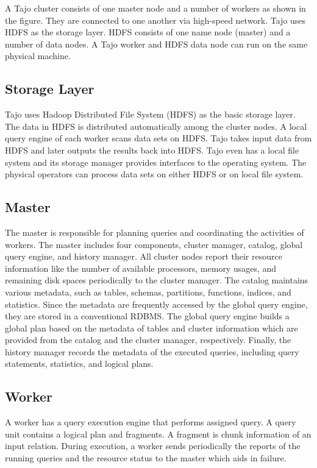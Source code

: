 \documentclass[9pt,twocolumn,twoside]{styles/osajnl}
\begin{document}
\cite{tajo-paper} A Tajo cluster consists of one master node and a
number of workers as shown in the figure. They are connected to one
another via high-speed network. Tajo uses HDFS as the storage
layer. HDFS consists of one name node (master) and a number of data
nodes. A Tajo worker and HDFS data node can run on the same physical
machine.

\subsection{Storage Layer}
\cite{tajo-paper}Tajo uses Hadoop Distributed File System (HDFS) as
the basic storage layer. The data in HDFS is distributed automatically
among the cluster nodes. A local query engine of each worker scans
data sets on HDFS. Tajo takes input data from HDFS and later outputs
the results back into HDFS. Tajo even has a local file system and its
storage manager provides interfaces to the operating system. The
physical operators can process data sets on either HDFS or on local
file system.

\subsection{Master}

\cite{tajo-paper} \cite{www-apache-tajo} The master is responsible for
planning queries and coordinating the activities of workers. The
master includes four components, cluster manager, catalog, global
query engine, and history manager. All cluster nodes report their
resource information like the number of available processors, memory
usages, and remaining disk spaces periodically to the cluster
manager. The catalog maintains various metadata, such as tables,
schemas, partitions, functions, indices, and statistics. Since the
metadata are frequently accessed by the global query engine, they are
stored in a conventional RDBMS. The global query engine builds a
global plan based on the metadata of tables and cluster information
which are provided from the catalog and the cluster manager,
respectively. Finally, the history manager records the metadata of the
executed queries, including query statements, statistics, and logical
plans.

\subsection{Worker}

\cite{tajo-paper} \cite{www-apache-tajo}A worker has a query execution
engine that performs assigned query. A query unit contains a logical
plan and fragments. A fragment is chunk information of an input
relation. During execution, a worker sends periodically the reports of
the running queries and the resource status to the master which aids
in failure.
\end{document}
